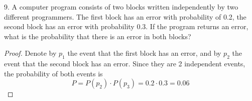 \documentclass[10pt,a4paper]{article}
\begin{document}
9. A computer program consists of two blocks written independently by two different programmers. The first block has an error with probability of 0.2, the second block has an error with probability 0.3. If the program returns an error, what is the probability that there is an error in both blocks?

\begin{proof}
Denote by $p_1$ the event that the first block has an error, and by $p_2$ the event that the second block has an error. Since they are 2 independent events, the probability of both events is \[ P = P(p_2) \cdot P(p_3) = 0.2 \cdot 0.3 = 0.06 \]
\end{proof}
\end{document}
